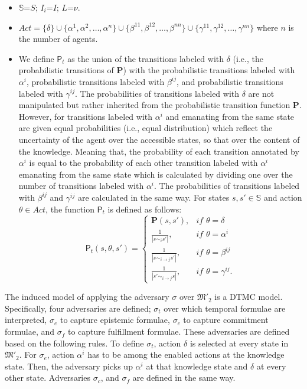 \begin{itemize}
\item $\mathbb{S}$=$S$; $I_i$=$I$; $L$=$\nu$.

\item $Act = \{\delta \} \cup \{\alpha^1, \alpha^2, \dots, \alpha^n\} \cup \{\beta^{11}, \beta^{12}, \dots, \beta^{nn}\} \cup \{\gamma^{11}, \gamma^{12}, \dots, \gamma^{nn}\}$ where $n$ is the number of agents.

\item We define $\textsf{P}_t$ as the union of the transitions labeled with $\delta$ (i.e., the probabilistic transitions of $\textbf{P}$) with the probabilistic transitions labeled with $\alpha^i$, probabilistic transitions labeled with $\beta^{ij}$, and probabilistic transitions labeled with $\gamma^{ij}$. The probabilities of transitions labeled with $\delta$ are not manipulated but rather inherited from the probabilistic transition function $\textbf{P}$. However, for transitions labeled with $\alpha^i$ and emanating from the same state are given equal probabilities (i.e., equal distribution) which reflect the uncertainty of the agent over the accessible states, so that over the content of the knowledge. Meaning that, the probability of each transition annotated by $\alpha^i$ is equal to the probability of each other transition labeled with $\alpha^i$ emanating from the same state which is calculated by dividing one over the number of transitions labeled with $\alpha^i$. The probabilities of transitions labeled with $\beta^{ij}$ and $\gamma^{ij}$ are calculated in the same way. For states $s, s' \in \mathbb{S}$ and  action $\theta \in Act$, the function $\textsf{P}_t$ is defined as follows:
\begin{equation*}
    \textsf{P}_t(s, \theta , s' )=
\begin{cases}
    \textbf{P}(s, s'),   & \textit{if } \theta = \delta  \\
    \frac{1}{|s\sim_i s'|},   & \textit{if } \theta = \alpha^i\\
    \frac{1}{|s\sim_{i \rightarrow j} s'|},   & \textit{if } \theta = \beta^{ij}\\
    \frac{1}{|s'\sim_{i \rightarrow j} s|},   & \textit{if } \theta = \gamma^{ij}.
    \end{cases}
    \end{equation*}

\end{itemize}


The induced model of applying the adversary $\sigma$ over
$\mathfrak{M'_2}$ is a DTMC model. Specifically, four adversaries are defined; $\sigma_t$ over which temporal formulae are interpreted, $\sigma_e$ to capture epistemic formulae, $\sigma_c$ to capture commitment formulae, and $\sigma_f$ to capture fulfillment formulae. These adversaries are defined based on the following rules. To define $\sigma_t$, action $\delta$ is selected at every state in $\mathfrak{M'_2}$. For $\sigma_e$, action $\alpha^i$ has to be among the enabled actions at the knowledge state. Then, the adversary picks up $\alpha^i$ at that knowledge state and $\delta$ at every other state. Adversaries $\sigma_c$, and $\sigma_f$ are defined in the same way.

